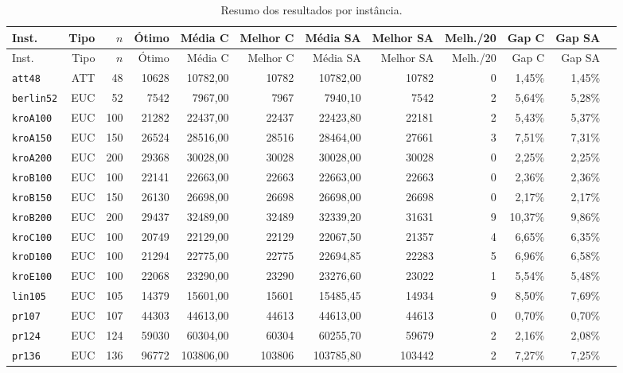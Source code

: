 \documentclass[12pt,a4paper]{article}
\begin{document}
\begingroup
\tiny
\setlength{\tabcolsep}{2pt}
\begin{longtable}{@{}lrrrrrrrrrrr@{}}
\caption{Resumo dos resultados por instância.}\\
\toprule
Inst. & Tipo & $n$ & Ótimo & Média C & Melhor C & Média SA & Melhor SA & Melh./20 & Gap C & Gap SA \\
\midrule
\endfirsthead
\toprule
Inst. & Tipo & $n$ & Ótimo & Média C & Melhor C & Média SA & Melhor SA & Melh./20 & Gap C & Gap SA \\
\midrule
\endhead
\bottomrule
\endfoot
\texttt{att48} & ATT & 48 & 10628 & 10782,00 & 10782 & 10782,00 & 10782 & 0 & 1,45\% & 1,45\% \\
\texttt{berlin52} & EUC & 52 & 7542 & 7967,00 & 7967 & 7940,10 & 7542 & 2 & 5,64\% & 5,28\% \\
\texttt{kroA100} & EUC & 100 & 21282 & 22437,00 & 22437 & 22423,80 & 22181 & 2 & 5,43\% & 5,37\% \\
\texttt{kroA150} & EUC & 150 & 26524 & 28516,00 & 28516 & 28464,00 & 27661 & 3 & 7,51\% & 7,31\% \\
\texttt{kroA200} & EUC & 200 & 29368 & 30028,00 & 30028 & 30028,00 & 30028 & 0 & 2,25\% & 2,25\% \\
\texttt{kroB100} & EUC & 100 & 22141 & 22663,00 & 22663 & 22663,00 & 22663 & 0 & 2,36\% & 2,36\% \\
\texttt{kroB150} & EUC & 150 & 26130 & 26698,00 & 26698 & 26698,00 & 26698 & 0 & 2,17\% & 2,17\% \\
\texttt{kroB200} & EUC & 200 & 29437 & 32489,00 & 32489 & 32339,20 & 31631 & 9 & 10,37\% & 9,86\% \\
\texttt{kroC100} & EUC & 100 & 20749 & 22129,00 & 22129 & 22067,50 & 21357 & 4 & 6,65\% & 6,35\% \\
\texttt{kroD100} & EUC & 100 & 21294 & 22775,00 & 22775 & 22694,85 & 22283 & 5 & 6,96\% & 6,58\% \\
\texttt{kroE100} & EUC & 100 & 22068 & 23290,00 & 23290 & 23276,60 & 23022 & 1 & 5,54\% & 5,48\% \\
\texttt{lin105} & EUC & 105 & 14379 & 15601,00 & 15601 & 15485,45 & 14934 & 9 & 8,50\% & 7,69\% \\
\texttt{pr107} & EUC & 107 & 44303 & 44613,00 & 44613 & 44613,00 & 44613 & 0 & 0,70\% & 0,70\% \\
\texttt{pr124} & EUC & 124 & 59030 & 60304,00 & 60304 & 60255,70 & 59679 & 2 & 2,16\% & 2,08\% \\
\texttt{pr136} & EUC & 136 & 96772 & 103806,00 & 103806 & 103785,80 & 103442 & 2 & 7,27\% & 7,25\% \\

\end{longtable}
\end{document}
